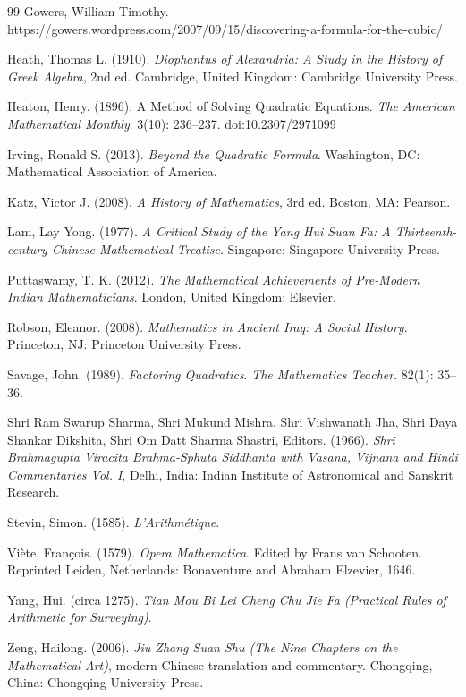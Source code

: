 \documentclass[11pt]{article}
\begin{document}
\begin{thebibliography}{99}
   Gowers, William Timothy.
    https://gowers.wordpress.com/2007/09/15/discovering-a-formula-for-the-cubic/

   Heath, Thomas L. (1910). \emph{Diophantus of Alexandria:
    A Study in the History of Greek Algebra}, 2nd ed. Cambridge, United
    Kingdom: Cambridge University Press.

   Heaton, Henry. (1896). A Method of Solving Quadratic
    Equations.  \emph{The American Mathematical Monthly}. 3(10): 236--237.
    doi:10.2307/2971099

   Irving, Ronald S. (2013). \emph{Beyond the Quadratic
    Formula}. Washington, DC: Mathematical Association of America.

   Katz, Victor J. (2008). \emph{A History of Mathematics},
    3rd ed. Boston, MA: Pearson.

   Lam, Lay Yong. (1977). \emph{A Critical Study of the Yang
    Hui Suan Fa: A Thirteenth-century Chinese Mathematical Treatise}.
    Singapore: Singapore University Press.

   Puttaswamy, T. K. (2012). \emph{The Mathematical
    Achievements of Pre-Modern Indian Mathematicians}. London, United
    Kingdom: Elsevier.

   Robson, Eleanor. (2008). \emph{Mathematics in Ancient
    Iraq: A Social History}. Princeton, NJ: Princeton University Press.

   Savage, John. (1989). \emph{Factoring Quadratics}. 
    \emph{The Mathematics Teacher}. 82(1): 35--36.

   Shri Ram Swarup Sharma, Shri Mukund Mishra, Shri
    Vishwanath Jha, Shri Daya Shankar Dikshita, Shri Om Datt Sharma
    Shastri, Editors. (1966). \emph{Shri Brahmagupta Viracita Brahma-Sphuta
    Siddhanta with Vasana, Vijnana and Hindi Commentaries Vol. I}, Delhi,
    India: Indian Institute of Astronomical and Sanskrit Research.

   Stevin, Simon. (1585). \emph{L'Arithm\'etique}.

   Vi\`ete, Fran\c{c}ois. (1579). \emph{Opera Mathematica}.
    Edited by Frans van Schooten. Reprinted Leiden, Netherlands:
    Bonaventure and Abraham Elzevier, 1646.

   Yang, Hui. (circa 1275). \emph{Tian Mou Bi Lei Cheng
    Chu Jie Fa (Practical Rules of Arithmetic for Surveying)}.

   Zeng, Hailong. (2006). \emph{Jiu Zhang Suan Shu (The Nine
    Chapters on the Mathematical Art)}, modern Chinese translation and
    commentary. Chongqing, China: Chongqing University Press.

\end{thebibliography}
\end{document}

